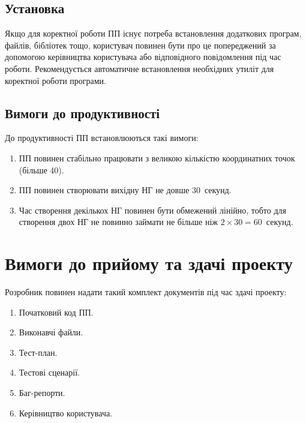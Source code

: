 \documentclass[a4paper,oneside,DIV=12,12pt]{scrartcl}
\begin{document}
		\subsection{Установка}
			Якщо для коректної роботи ПП існує потреба встановлення додаткових програм, файлів, бібліотек тощо, користувач повинен бути про це попереджений за допомогою керівництва користувача або відповідного повідомлення під час роботи. Рекомендується автоматичне встановлення необхідних утиліт для коректної роботи програми.

		\subsection{Вимоги до продуктивності}
			До продуктивності ПП встановлюються такі вимоги:
			\begin{enumerate}
				\item ПП повинен стабільно працювати з великою кількістю координатних точок (більше 40).
				\item ПП повинен створювати вихідну НГ не довше 30~секунд.
				\item Час створення декількох НГ повинен бути обмежений лінійно, тобто для створення двох НГ не повинно займати не більше ніж $2 \times 30 = 60$~секунд.
			\end{enumerate}

	\section{Вимоги до прийому та здачі проекту}

		Розробник повинен надати такий комплект документів під час здачі проекту:
		\begin{enumerate}
			\item Початковий код ПП.
			\item Виконавчі файли.
			\item Тест-план.
			\item Тестові сценарії.
			\item Баг-репорти.
			\item Керівництво користувача.
		\end{enumerate}

\end{document}
